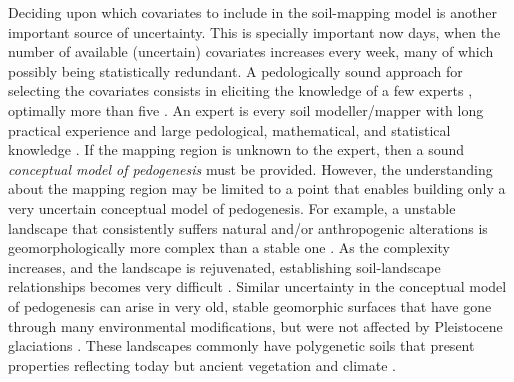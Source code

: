 Deciding upon which covariates to include in the soil-mapping model is another important source of 
uncertainty. This is specially important now days, when the number of available (uncertain) 
covariates increases every week, many of which possibly being statistically redundant. A 
pedologically sound approach for selecting the covariates consists in eliciting the knowledge of a 
few experts \citep{LarkEtAl2007b}, optimally more than five \citep{MeyerEtAl2001}. An expert is 
every soil modeller/mapper with long practical experience and large pedological, mathematical, and 
statistical knowledge \citep{MeyerEtAl2001}. If the mapping region is unknown to the expert, then
a sound \textit{conceptual model of pedogenesis} must be provided. However, the understanding
about the mapping region may be limited to a point that enables building only a very uncertain 
conceptual model of pedogenesis. For example, a unstable landscape that consistently suffers natural
and/or anthropogenic alterations is geomorphologically more complex than a stable one 
\citep{Schumm1979}. As the complexity increases, and the landscape is rejuvenated, establishing 
soil-landscape relationships becomes very difficult \citep{StreckEtAl2008}. Similar uncertainty 
in the conceptual model of pedogenesis can arise in very old, stable geomorphic surfaces that have 
gone through many environmental modifications, but were not affected by Pleistocene glaciations 
\citep{McKenzieEtAl2000a}. These landscapes commonly have polygenetic soils that present properties
reflecting today but ancient vegetation and climate \citep{PainEtAl1995, Ker1998a}.

